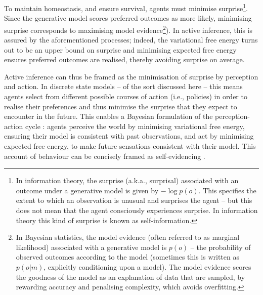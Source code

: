 \documentclass[review,12pt,authoryear]{elsarticle}
\begin{document}
To maintain homeostasis, and ensure survival, agents must minimise surprise\footnote{In information theory, the surprise (a.k.a., surprisal) associated with an outcome under a generative model is given by $-\log p(o)$. This specifies the extent to which an observation is unusual and surprises the agent – but this does not mean that the agent consciously experiences surprise. In information theory this kind of surprise is known as self-information.}. Since the generative model scores preferred outcomes as more likely, minimising surprise corresponds to maximising model evidence\footnote{In Bayesian statistics, the model evidence (often referred to as marginal likelihood) associated with a generative model is $p(o)$ -- the probability of observed outcomes according to the model (sometimes this is written as $p(o|m)$, explicitly conditioning upon a model). The model evidence scores the goodness of the model as an explanation of data that are sampled, by rewarding accuracy and penalising complexity, which avoids overfitting.}). In active inference, this is assured by the aforementioned processes; indeed, the variational free energy turns out to be an upper bound on surprise and minimising expected free energy ensures preferred outcomes are realised, thereby avoiding surprise on average.

Active inference can thus be framed as the minimisation of surprise \citep{fristonFreeenergyPrincipleRough2009,fristonFreeenergyPrincipleUnified2010,fristonFreeenergyBrain2007,fristonFreeEnergyPrinciple2006} by perception and action. In discrete state models -- of the sort discussed here -- this means agents select from different possible courses of action (i.e., policies) in order to realise their preferences and thus minimise the surprise that they expect to encounter in the future. This enables a Bayesian formulation of the perception-action cycle \citep{fusterPrefrontalCortexBridging1990}: agents perceive the world by minimising variational free energy, ensuring their model is consistent with past observations, and act by minimising expected free energy, to make future sensations consistent with their model. This account of behaviour can be concisely framed as self-evidencing \citep{hohwySelfEvidencingBrain2016}.
\end{document}

